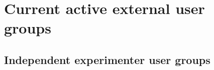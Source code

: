 \documentclass[11pt]{article}
\date{}
\title{}
\begin{document}
\section{Current active external user groups}


\subsection{Independent experimenter user groups}
\end{document}
